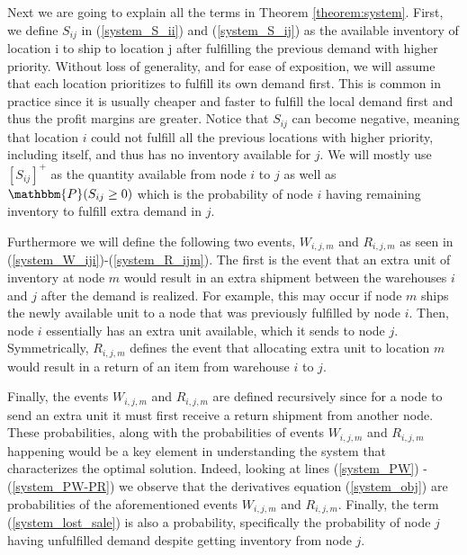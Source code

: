 \documentclass[poms,final,blindrev]{poms1_V1} %
\begin{document}
Next we are going to explain all the terms in Theorem \ref{theorem:system}.
First, we define $S_{ij}$ in (\ref{system_S_ii}) and (\ref{system_S_ij}) as the available inventory of location i to ship to location j after fulfilling the previous demand with higher priority. Without loss of generality, and for ease of exposition, we will assume that each location prioritizes to fulfill its own demand first. This is common in practice since it is usually cheaper and faster to fulfill the local demand first and thus the profit margins are greater. Notice that $S_{ij}$ can become negative, meaning that location $i$ could not fulfill all the previous locations with higher priority, including itself, and thus has no inventory available for $j$. We will mostly use $[S_{ij}]^+$ as the quantity available from node $i$ to $j$ as well as $\mathbbm{P}(S_{ij}\geq 0)$ which is the probability of node $i$ having remaining inventory to fulfill extra demand in $j$.


Furthermore we will define the following two events, $W_{i,j,m}$ and $R_{i,j,m}$ as seen in (\ref{system_W_iji})-(\ref{system_R_ijm}). The first is the event that an extra unit of inventory at node $m$ would result in an extra shipment between the warehouses $i$ and $j$ after the demand is realized. For example, this may occur if node $m$ ships the newly available unit to a node that was previously fulfilled by node $i$. Then, node $i$ essentially has an extra unit available, which it sends to node $j$.
Symmetrically, $R_{i,j,m}$ defines the event that allocating extra unit to location $m$ would result in a return of an item from warehouse $i$ to $j$. 



Finally, the events $W_{i,j,m}$ and $R_{i,j,m}$ are defined recursively since for a node to send an extra unit it must first receive a return shipment from another node.
These probabilities, along with the probabilities of events $W_{i,j,m}$ and $R_{i,j,m}$ happening would be a key element in understanding the system that characterizes the optimal solution. Indeed, looking at lines (\ref{system_PW}) -(\ref{system_PW-PR}) we observe that the derivatives equation (\ref{system_obj}) are probabilities of the aforementioned events $W_{i,j,m}$ and $R_{i,j,m}$. Finally, the term (\ref{system_lost_sale}) is also a probability, specifically the probability of node $j$ having unfulfilled demand despite getting inventory from node $j$.
\end{document}
